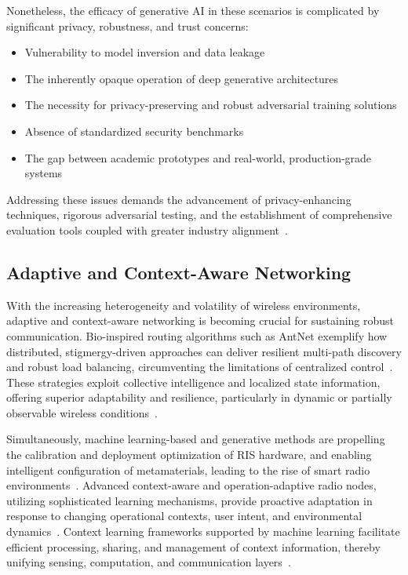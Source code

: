 Nonetheless, the efficacy of generative AI in these scenarios is complicated by significant privacy, robustness, and trust concerns:
\begin{itemize}
    \item Vulnerability to model inversion and data leakage
    \item The inherently opaque operation of deep generative architectures
    \item The necessity for privacy-preserving and robust adversarial training solutions
    \item Absence of standardized security benchmarks
    \item The gap between academic prototypes and real-world, production-grade systems
\end{itemize}
Addressing these issues demands the advancement of privacy-enhancing techniques, rigorous adversarial testing, and the establishment of comprehensive evaluation tools coupled with greater industry alignment~\cite{ref46,ref49}.

\subsection{Adaptive and Context-Aware Networking}

With the increasing heterogeneity and volatility of wireless environments, adaptive and context-aware networking is becoming crucial for sustaining robust communication. Bio-inspired routing algorithms such as AntNet exemplify how distributed, stigmergy-driven approaches can deliver resilient multi-path discovery and robust load balancing, circumventing the limitations of centralized control~\cite{ref30}. These strategies exploit collective intelligence and localized state information, offering superior adaptability and resilience, particularly in dynamic or partially observable wireless conditions~\cite{ref30}.

Simultaneously, machine learning-based and generative methods are propelling the calibration and deployment optimization of RIS hardware, and enabling intelligent configuration of metamaterials, leading to the rise of smart radio environments~\cite{ref27,ref39}. Advanced context-aware and operation-adaptive radio nodes, utilizing sophisticated learning mechanisms, provide proactive adaptation in response to changing operational contexts, user intent, and environmental dynamics~\cite{ref28}. Context learning frameworks supported by machine learning facilitate efficient processing, sharing, and management of context information, thereby unifying sensing, computation, and communication layers~\cite{ref28,ref30}.

